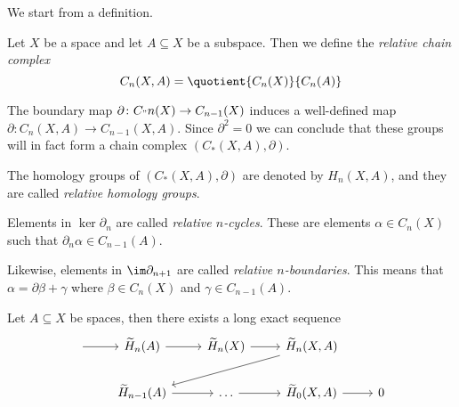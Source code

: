 We start from a definition.
\begin{definition}\label{def:relative-chain-complex}
	Let $X$ be a space and let $A \subseteq X$ be a subspace. Then we define the \emph{relative chain complex}
	\[
		C_n(X, A) = \quotient{C_n(X)}{C_n(A)}
	\]
\end{definition}

\begin{exercise}
	The boundary map $\partial \colon C_"n(X) \to C_{n - 1}(X)$ induces a well-defined map $\partial \colon C_n(X, A) \to C_{n - 1}(X, A)$.
	Since $\partial^2 = 0$ we can conclude that these groups will in fact form a chain complex  $(C_\ast(X, A), \partial)$.
\end{exercise}

\begin{definition}\label{def:relative-homology}
	The homology groups of $(C_\ast(X, A), \partial)$ are denoted by $H_n(X, A)$, and they are called \emph{relative homology groups}.

	Elements in $\ker \partial_n$ are called \emph{relative $n$-cycles}\label{def:relative-cycle}. These are elements $\alpha \in C_n(X)$
	such that $\partial_n\alpha \in C_{n - 1}(A)$.
	\begin{figure}[H]
		\centering
		\label{fig:def:relative-homology-1}
	\end{figure}

	Likewise, elements in $\im \partial_{n + 1}$ are called \emph{relative $n$-boundaries}\label{def:relative-boundary}.
	This means that $\alpha = \partial \beta + \gamma$ where $\beta \in C_n(X)$ and $\gamma \in C_{n - 1}(A)$.
	\begin{figure}[H]
		\centering
		\label{fig:def:relative-homology-2}
	\end{figure}
\end{definition}

\begin{theorem}\label{thm:long-exact-sequence-of-a-pair}
	Let $A \subseteq X$ be spaces, then there exists a long exact sequence
	\[\begin{tikzcd}
			{} & {\widetilde{H}_n(A)} & {\widetilde{H}_n(X)} & {\widetilde{H}_n(X, A)} \\
			& {\widetilde{H}_{n-1}(A)} & \ldots & {\widetilde{H}_{0}(X, A)} & 0
			\arrow[from=1-1, to=1-2]
			\arrow[from=1-2, to=1-3]
			\arrow[from=1-3, to=1-4]
			\arrow[from=2-4, to=2-5]
			\arrow[from=2-3, to=2-4]
			\arrow[from=2-2, to=2-3]
			\arrow[from=1-4, to=2-2]
		\end{tikzcd}\]
\end{theorem}

